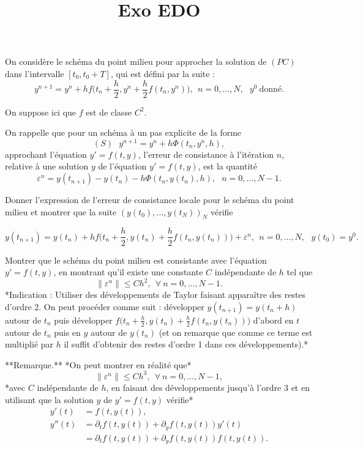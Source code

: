 
\title{Exo EDO}


\maketitle

\be
\ben
On considère le schéma du point milieu pour approcher la solution de $(PC)$ dans l'intervalle $[t_0,t_0+T]$, qui est défini par la suite :
  $$
    y^{n+1} = y^n+hf\Big(t_{n}+\frac{h}{2},y^n+\frac{h}{2}f(t_n,y^n)\Big),\ \ n=0,\dots,N,\ \ \ y^0\ \textrm{donné}. 
    $$

On suppose ici que $f$ est de classe $C^2.$

On rappelle que pour un schéma à un pas explicite de la forme
$$
(S)\ \ \ y^{n+1} = y^n+h\Phi(t_n,y^n,h),
$$
approchant l'équation $y'=f(t,y)$, l'erreur de consistance à l'itération $n$, relative à une solution $y$ de l'équation $y'=f(t,y)$, 
est la quantité
$$
\varepsilon^n=y(t_{n+1})-y(t_{n})-h\Phi(t_n,y(t_n),h),\ \ \ n=0,\dots,N-1.
$$

\item Donner l'expression de l'erreur de consistance locale pour le schéma du point milieu et montrer que la suite $(y(t_0),\dots,y(t_N))_N$ vérifie

 $$
    y(t_{n+1}) = y(t_n)+hf\Big(t_{n}+\frac{h}{2},y(t_n)+\frac{h}{2}f(t_n,y(t_n))\Big)+\varepsilon^n,\ \ n=0,\dots,N,\ \ \ y(t_0)=y^0. 
    $$


\item Montrer que le  schéma du point milieu est consistante avec l'équation $y'=f(t,y)$, en montrant qu'il existe une constante $C$ indépendante de $h$ tel que
    $$
\|\varepsilon^n\|\leq C h^2,\ \ \forall\ n=0,\dots,N-1.
    $$
*Indication : Utiliser des développements de Taylor faisant apparaître des restes d'ordre 2. On peut procéder comme suit : développer $y(t_{n+1})=y(t_n+h)$ autour de $t_n$ puis développer $f\big(t_{n}+\frac{h}{2},y(t_n)+\frac{h}{2}f(t_n,y(t_n))\big)$ d'abord en $t$ autour de $t_n$ puis en $y$ autour de $y(t_n)$ (et on remarque que comme ce terme est multiplié par $h$ il suffit d'obtenir des restes d'ordre 1 dans ces développements).*
     
**Remarque.** *On peut montrer en réalité que*
    $$
\|\varepsilon^n\|\leq C h^3,\ \ \forall\ n=0,\dots,N-1,
    $$
*avec $C$ indépendante de $h$, en faisant des développements jusqu'à l'ordre 3 et en utilisant que la solution $y$ de $y'=f(t,y)$ vérifie* 
      \begin{align*}
        y'(t)&=f(t,y(t)),\\
        y''(t)&=\partial_t f(t,y(t))+\partial_y f(t,y(t))y'(t)\\
             &=\partial_t f(t,y(t))+\partial_y f(t,y(t))f(t,y(t)).
      \end{align*}
      
